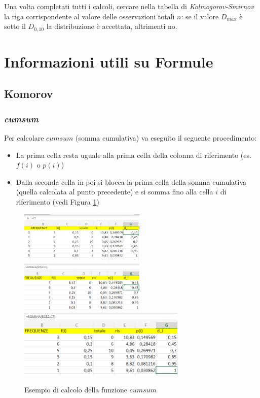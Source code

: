Una volta completati tutti i calcoli, cercare nella tabella di
\textit{Kolmogorov-Smirnov} la riga corrispondente al valore delle osservazioni
totali $n$: se il valore $D_{max}$ è sotto il $D_{0,10}$ la distribuzione è
accettata, altrimenti no.

\section{Informazioni utili su Formule}

\subsection{Komorov}

\subsubsection{\textit{cumsum}}

Per calcolare $cumsum$ (somma cumulativa) va eseguito il seguente procedimento:
\begin{itemize}
      \item La prima cella resta uguale alla prima cella della colonna di
            riferimento (es. $f(i)$ o $p(i)$)
      \item Dalla seconda cella in poi si blocca la prima cella della somma
            cumulativa (quella calcolata al punto precedente) e si somma fino alla
            cella $i$ di riferimento (vedi Figura \ref{cumsum})
\end{itemize}

\begin{figure}[H]
      \centering
      \includegraphics[width=6cm, keepaspectratio]{capitoli/goodnes_of_fit/imgs/cumsum1.png}
      \includegraphics[width=6cm, keepaspectratio]{capitoli/goodnes_of_fit/imgs/cumsum2.png}
      \includegraphics[width=8cm, keepaspectratio]{capitoli/goodnes_of_fit/imgs/cumsum3.png}
      \caption{Esempio di calcolo della funzione $cumsum$}
      \label{cumsum}
\end{figure}